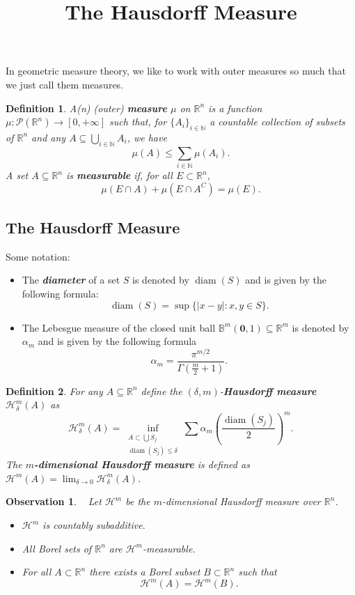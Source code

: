 \documentclass[10pt]{article}
\title{\textbf{The Hausdorff Measure}}
\date{}
\theoremstyle{plain}
\newtheorem{definition}{Definition}
\newtheorem{observation}{Observation}
\DeclareMathOperator{\diam}{diam}
\begin{document}
	\maketitle 
	
In geometric measure theory, we like to work with outer measures so much that we just call them measures. 
	\begin{definition}
		A(n) (outer) \textbf{\textit{measure}} $\mu$ on $\mathbb{R}^n$ is a function $\mu: \mathcal{P}(\mathbb{R}^n) \to [0, + \infty]$ such that, for $\{A_i\}_{i \in \mathbb{N}}$ a countable collection of subsets of $\mathbb{R}^n$ and any $A \subseteq \bigcup_{i \in \mathbb{N}} A_i$, we have $$\mu(A) \leq \sum_{i \in \mathbb{N}} \mu(A_i).$$ A set $A \subseteq \mathbb{R}^n$ is \textbf{\textit{measurable}} if, for all $E \subset \mathbb{R}^n$, $$\mu(E \cap A) + \mu(E \cap A^C) = \mu(E).$$
	\end{definition}

	
\subsection*{The Hausdorff Measure}
	Some notation:	
		\begin{itemize}
			\item The \textbf{\textit{diameter}} of a set $S$ is denoted by $\diam(S)$ and is given by the following formula: $$\diam(S) = \sup \{|x - y| : x, y \in S\}.$$ 
			
			\item The Lebesgue measure of the closed unit ball $\mathbb{B}^m(\mathbf{0}, 1) \subseteq \mathbb{R}^m$ is denoted by $\alpha_m$ and is given by the following formula $$\alpha_m = \frac{\pi^{m/2}}{\Gamma\left(\frac{m}{2} + 1\right)}.$$ 
		\end{itemize}
	\begin{definition}
		For any $A \subseteq \mathbb{R}^n$ define the $(\delta, m)$-\textbf{\textit{Hausdorff measure}} $\mathcal{H}_\delta^m(A)$ as $$\mathcal{H}_\delta^m(A) = \inf_{\substack{A \subset \bigcup S_j \\ \diam(S_j) \leq \delta}} \sum \alpha_m \left(\frac{\diam(S_j)}{2}\right)^m.$$ The \textbf{\textit{$m$-dimensional Hausdorff measure}} is defined as $\mathcal{H}^m(A) = \lim_{\delta \to 0} \mathcal{H}_{\delta}^m(A)$. 
	\end{definition}
	
	\newpage 
	\begin{observation} ~
		Let $\mathcal{H}^m$ be the $m$-dimensional Hausdorff measure over $\mathbb{R}^n$. 
			\begin{itemize}
				\item[(1)] $\mathcal{H}^m$ is countably subadditive. 
				
				\item[(2)] All Borel sets of $\mathbb{R}^n$ are $\mathcal{H}^m$-measurable. 
				
				\item[(3)] For all $A \subset \mathbb{R}^n$ there exists a Borel subset $B \subset \mathbb{R}^n$ such that $$\mathcal{H}^m(A) = \mathcal{H}^m(B).$$
			\end{itemize}
	\end{observation}
\end{document}
